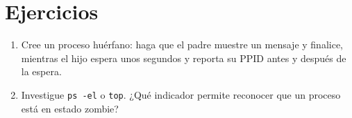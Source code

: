 \documentclass[12pt,a4paper]{article}
\begin{document}
\section{Ejercicios}
\begin{enumerate}
    \item Cree un proceso huérfano: haga que el padre muestre un mensaje y finalice, mientras el hijo espera unos segundos y reporta su PPID antes y después de la espera.
    \item Investigue \texttt{ps -el} o \texttt{top}. ¿Qué indicador permite reconocer que un proceso está en estado zombie?
\end{enumerate}
\end{document}
